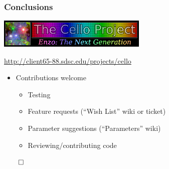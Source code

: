\begin{frame}[fragile] \frametitle{Conclusions}
\centerline{\includegraphics[width=2.8in]{cello-logo.png}}
\centerline{\footnotesize{\textcolor{blue}{\url{http://client65-88.sdsc.edu/projects/cello}}}}

\centerline{\footnotesize{}}
\centerline{\footnotesize{}}

\begin{itemize}
\item Contributions welcome
\begin{itemize}
\item Testing
\item Feature requests (``Wish List'' wiki or ticket)
\item Parameter suggestions (``Parameters'' wiki)
\item Reviewing/contributing code
\end{itemize}
\end{itemize}
\centerline{$\qed$}
\end{frame}
